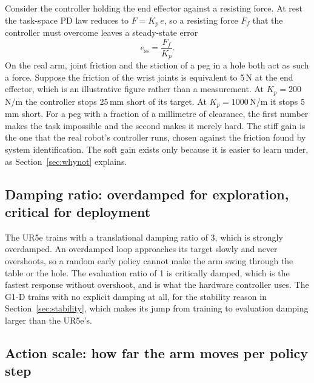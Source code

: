 Consider the controller holding the end effector against a resisting force. At rest the task-space PD law reduces to $F = K_p\,e$, so a resisting force $F_f$ that the controller must overcome leaves a steady-state error
\begin{equation}
  e_{\mathrm{ss}} = \frac{F_f}{K_p}.
\end{equation}
On the real arm, joint friction and the stiction of a peg in a hole both act as such a force. Suppose the friction of the wrist joints is equivalent to 5\,N at the end effector, which is an illustrative figure rather than a measurement. At $K_p = 200$\,N/m the controller stops 25\,mm short of its target. At $K_p = 1000$\,N/m it stops 5\,mm short. For a peg with a fraction of a millimetre of clearance, the first number makes the task impossible and the second makes it merely hard. The stiff gain is the one that the real robot's controller runs, chosen against the friction found by system identification. The soft gain exists only because it is easier to learn under, as Section~\ref{sec:whynot} explains.

\subsection{Damping ratio: overdamped for exploration, critical for deployment}

The UR5e trains with a translational damping ratio of 3, which is strongly overdamped. An overdamped loop approaches its target slowly and never overshoots, so a random early policy cannot make the arm swing through the table or the hole. The evaluation ratio of 1 is critically damped, which is the fastest response without overshoot, and is what the hardware controller uses. The G1-D trains with no explicit damping at all, for the stability reason in Section~\ref{sec:stability}, which makes its jump from training to evaluation damping larger than the UR5e's.

\subsection{Action scale: how far the arm moves per policy step}

